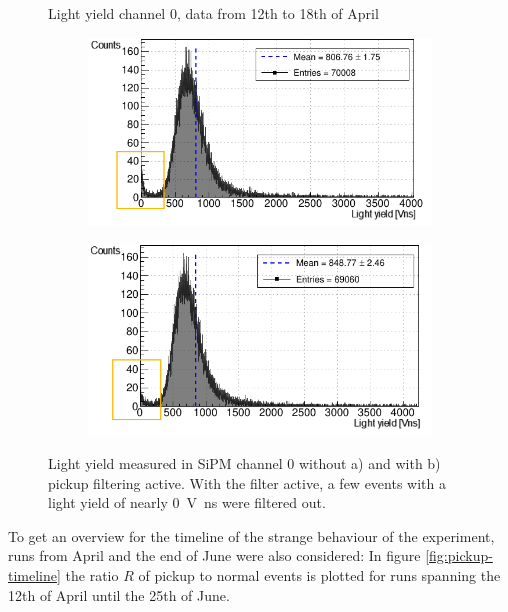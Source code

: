     \begin{figure}[h!]
        \centering
        Light yield channel 0, data from 12th to 18th of April
        \begin{subfigure}{.5\textwidth}
        \centering
        \includegraphics[width=\textwidth]{pictures/integrals_nocut_12to18_2.pdf}
        \caption{}
        \label{fig:integral-nocut}
        \end{subfigure}%
        \begin{subfigure}{.5\textwidth}
        \centering
        \includegraphics[width=\textwidth]{pictures/integrals_cut_12to18_2.pdf}
        \caption{}
        \label{fig:integral-cut}
        \end{subfigure}
        \caption{Light yield measured in \ac{SiPM} channel 0 without a) and with b) pickup filtering active. With the filter active, a few events with a light yield of nearly \SI{0}{\volt\nano\second} were filtered out.}
        \label{fig:pickup-filter}
    \end{figure}
    
    
    To get an overview for the timeline of the strange behaviour of the experiment, runs from April and the end of June were also considered: In figure \ref{fig:pickup-timeline} the ratio $R$ of pickup to normal events is plotted for runs spanning the 12th of April until the 25th of June.
    
